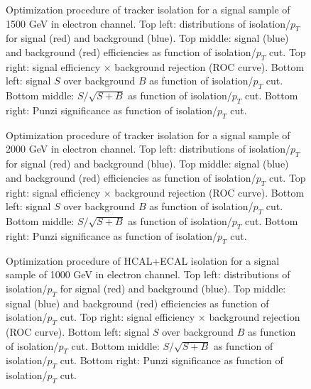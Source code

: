 \documentclass[12pt]{article} %
\begin{document}
\begin{figure}[H] %
  \caption{Optimization procedure of tracker isolation for a signal sample of 1500 GeV in electron channel. Top left: distributions of isolation/$p_T$ for signal (red) and background (blue). Top middle: signal (blue) and background (red) efficiencies as function of isolation/$p_T$ cut. Top right: signal efficiency $\times$ background rejection (ROC curve). Bottom left: signal $S$ over background $B$ as function of isolation/$p_T$ cut. Bottom middle: $S/\sqrt{S + B}$ as function of isolation/$p_T$ cut. Bottom right: Punzi significance as function of isolation/$p_T$ cut.}
  \label{fig:eletrk1500}
\end{figure}

\begin{figure}[H] %
  \caption{Optimization procedure of tracker isolation for a signal sample of 2000 GeV in electron channel. Top left: distributions of isolation/$p_T$ for signal (red) and background (blue). Top middle: signal (blue) and background (red) efficiencies as function of isolation/$p_T$ cut. Top right: signal efficiency $\times$ background rejection (ROC curve). Bottom left: signal $S$ over background $B$ as function of isolation/$p_T$ cut. Bottom middle: $S/\sqrt{S + B}$ as function of isolation/$p_T$ cut. Bottom right: Punzi significance as function of isolation/$p_T$ cut.}
  \label{fig:eletrk2000}
\end{figure}


\begin{figure}[H] %
  \caption{Optimization procedure of HCAL+ECAL isolation for a signal sample of 1000 GeV in electron channel. Top left: distributions of isolation/$p_T$ for signal (red) and background (blue). Top middle: signal (blue) and background (red) efficiencies as function of isolation/$p_T$ cut. Top right: signal efficiency $\times$ background rejection (ROC curve). Bottom left: signal $S$ over background $B$ as function of isolation/$p_T$ cut. Bottom middle: $S/\sqrt{S + B}$ as function of isolation/$p_T$ cut. Bottom right: Punzi significance as function of isolation/$p_T$ cut.}
  \label{fig:elecal1000}
\end{figure}
\end{document}
